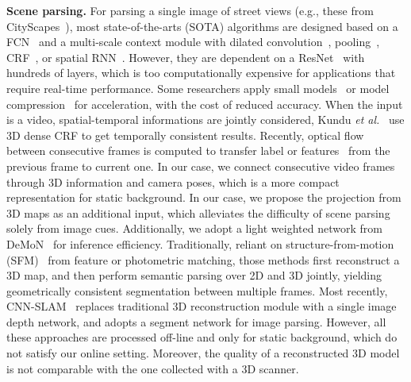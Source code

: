 \documentclass[10pt,twocolumn,letterpaper]{article}
\def\etal{\emph{et al.}}
\begin{document}
\textbf{Scene parsing.} For parsing a single image of street views (e.g., these from CityScapes~\cite{Cordts2016Cityscapes}), most state-of-the-arts (SOTA) algorithms are designed based on a FCN~\cite{WuSH16e} and a multi-scale context module with dilated convolution~\cite{ChenPSA17}, pooling~\cite{ZhaoSQWJ16}, CRF~\cite{higherordercrf_ECCV2016}, or spatial RNN~\cite{byeon2015scene}. However, they are dependent on a ResNet~\cite{HeZRS15} with hundreds of layers, which is too computationally expensive for applications that require real-time performance. 
Some researchers apply small models~\cite{PaszkeCKC16} or model compression~\cite{ZhaoQSSJ17} for acceleration, with the cost of reduced accuracy.
When the input is a video, spatial-temporal informations are jointly considered, Kundu \etal~\cite{kundu2016feature} use 3D dense CRF to get temporally consistent results. Recently, optical flow~\cite{dosovitskiy2015flownet} between consecutive frames is computed to transfer label or features~\cite{gadde2017semantic,zhu2016deep} from the previous frame to current one.  In our case, we connect consecutive video frames through 3D information and camera poses, which is a more compact representation for static background. 
In our case, we propose the projection from 3D maps as an additional input, which alleviates the difficulty of scene parsing solely from image cues. Additionally, we adopt a light weighted network from DeMoN~\cite{ummenhofer2016demon} for inference efficiency.%
 Traditionally, reliant on structure-from-motion (SFM)~\cite{hane2013joint} from feature or photometric matching, those methods first reconstruct a 3D map, and then perform semantic parsing over 2D and 3D jointly, yielding geometrically consistent segmentation between multiple frames.
 Most recently, CNN-SLAM~\cite{tateno2017cnn} replaces traditional 3D reconstruction module with a single image depth network, and adopts a segment network for image parsing.
 However, all these approaches are processed off-line and only for static background, which do not satisfy our online setting. Moreover, the quality of a reconstructed 3D model is not comparable with the one collected with a 3D scanner. %
\end{document}
